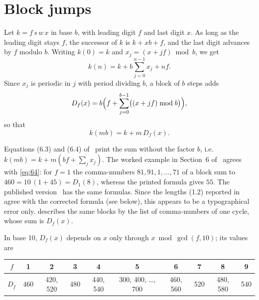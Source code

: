\section{Block jumps}
\label{sec:jumps}

Let $k = f\,s\,w\,x$ in base $b$, with leading digit $f$ and last digit $x$. As long as the leading
digit stays $f$, the successor of $k$ is $k + x b + f$, and the last digit advances by $f$ modulo
$b$. Writing $k(0) = k$ and $x_j = (x + j f) \bmod b$, we get
\begin{equation}
  \label{eq:63}
  k(n) = k + b \sum_{j=0}^{n-1} x_j + n f .
\end{equation}
Since $x_j$ is periodic in $j$ with period dividing $b$, a block of $b$ steps adds
\begin{equation}
  \label{eq:D}
  D_f(x) = b \Bigl( f + \sum_{j=0}^{b-1} \bigl( (x + j f) \bmod b \bigr) \Bigr),
\end{equation}
so that
\begin{equation}
  \label{eq:64}
  k(m b) = k + m \, D_f(x) .
\end{equation}

\begin{remark}
  Equations (6.3) and (6.4) of~\cite{comma} print the sum without the factor $b$, i.e.\
  $k(mb) = k + m(bf + \sum_j x_j)$. The worked example in Section~6 of~\cite{comma} agrees with
  \eqref{eq:64}: for $f = 1$ the comma-numbers $81, 91, 1, \dots, 71$ of a block sum to
  $460 = 10\,(1 + 45) = D_1(8)$, whereas the printed formula gives $55$. The published
  version~\cite{comma} has the same formulas. Since the lengths (1.2) reported in~\cite{comma} agree
  with the corrected formula (see below), this appears to be a typographical error only.
  \cite[Equation~(3)]{dbts} describes the same blocks by the list of comma-numbers of one cycle,
  whose sum is $D_f(x)$.
\end{remark}

In base 10, $D_f(x)$ depends on $x$ only through $x \bmod \gcd(f, 10)$; its values are
\begin{center}
  \begin{tabular}{@{}cccccccccc@{}}
    \toprule
    $f$ & 1 & 2 & 3 & 4 & 5 & 6 & 7 & 8 & 9 \\
    \midrule
    $D_f$ & 460 & 420, 520 & 480 & 440, 540 & 300, 400, \dots, 700 & 460, 560 & 520 & 480, 580 & 540 \\
    \bottomrule
  \end{tabular}
\end{center}


